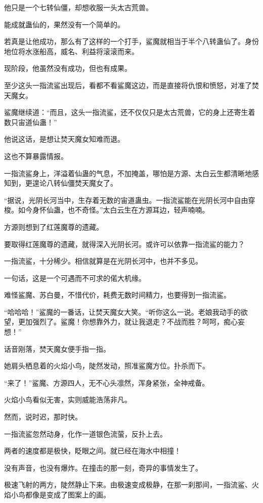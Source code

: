 \begin{this_body}
他只是一个七转仙僵，却想收服一头太古荒兽。

能成就蛊仙的，果然没有一个简单的。

若真是让他成功，那么有了这样的一个打手，鲨魔就相当于半个八转蛊仙了。身份地位将水涨船高，威名、利益将滚滚而来。

现阶段，他虽然没有成功，但也有成果。

至少这头一指流鲨出现后，看都不看鲨魔这边，而是直接将仇恨和愤怒，对准了焚天魔女。

鲨魔继续道：“而且，这头一指流鲨，还不仅仅只是太古荒兽，它的身上还寄生着数只宙道仙蛊！”

他说这话，是想让焚天魔女知难而退。

这也不算暴露情报。

一指流鲨身上，洋溢着仙蛊的气息，不加掩盖，哪怕是方源、太白云生都清晰地感知到，更遑论八转仙僵焚天魔女了。

“据说，光阴长河当中，生存着无数的宙道蛊虫。一指流鲨能在光阴长河中自由穿梭。如今身怀仙蛊，也不奇怪。”太白云生在方源耳边，轻声喃喃。

方源则想到了红莲魔尊的遗藏。

要取得红莲魔尊的遗藏，就得深入光阴长河。或许可以依靠一指流鲨的能力？

一指流鲨，十分稀少。相信就算是在光阴长河中，也并不多见。

一句话，这是一个可遇而不可求的偌大机缘。

难怪鲨魔、苏白曼，不惜代价，耗费无数时间精力，也要得到一指流鲨。

“哈哈哈！”鲨魔的一番话，让焚天魔女大笑。“听你这么一说。老娘我动手的欲望，更加强烈了。鲨魔！你想靠外力，就让我退走？不战而胜？呵呵，痴心妄想！”

话音刚落，焚天魔女便手指一指。

她肩头栖息着的火焰小鸟，陡然发动，照准鲨魔方位。扑杀而下。

“来了！”鲨魔、方源四人，无不心头凛然，浑身紧张，全神戒备。

火焰小鸟看似无害，实则威能浩荡非凡。

然而，说时迟，那时快。

一指流鲨忽然动身，化作一道银色流萤，反扑上去。

两者的速度都是极快，眨眼之间。就已经在海水中相撞！

没有声音，也没有爆炸。在撞击的那一刻，奇异的事情发生了。

极速飞射的两方，陡然静止下来。由极速变成极静，在那一刹那间，一指流鲨、火焰小鸟都像是变成了图案上的画。


\end{this_body}
